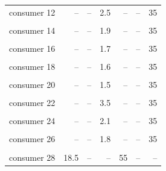 \documentclass[preprint,review,1p,authoryear]{elsarticle} %
\begin{document}
\begin{table}[!h]
{\begin{tabular}[t]{lrrrrrr}
consumer  12 & – & – & 2.5 & – & – & 35\\
\cellcolor{gray!10}{consumer  13} & \cellcolor{gray!10}{–} & \cellcolor{gray!10}{–} & \cellcolor{gray!10}{2.3} & \cellcolor{gray!10}{–} & \cellcolor{gray!10}{–} & \cellcolor{gray!10}{35}\\
consumer  14 & – & – & 1.9 & – & – & 35\\
\cellcolor{gray!10}{consumer  15} & \cellcolor{gray!10}{–} & \cellcolor{gray!10}{–} & \cellcolor{gray!10}{2.7} & \cellcolor{gray!10}{–} & \cellcolor{gray!10}{–} & \cellcolor{gray!10}{35}\\
\addlinespace
consumer  16 & – & – & 1.7 & – & – & 35\\
\cellcolor{gray!10}{consumer  17} & \cellcolor{gray!10}{–} & \cellcolor{gray!10}{–} & \cellcolor{gray!10}{1.9} & \cellcolor{gray!10}{–} & \cellcolor{gray!10}{–} & \cellcolor{gray!10}{35}\\
consumer  18 & – & – & 1.6 & – & – & 35\\
\cellcolor{gray!10}{consumer  19} & \cellcolor{gray!10}{–} & \cellcolor{gray!10}{–} & \cellcolor{gray!10}{1.5} & \cellcolor{gray!10}{–} & \cellcolor{gray!10}{–} & \cellcolor{gray!10}{35}\\
consumer  20 & – & – & 1.5 & – & – & 35\\
\addlinespace
\cellcolor{gray!10}{consumer  21} & \cellcolor{gray!10}{–} & \cellcolor{gray!10}{–} & \cellcolor{gray!10}{1.8} & \cellcolor{gray!10}{–} & \cellcolor{gray!10}{–} & \cellcolor{gray!10}{35}\\
consumer  22 & – & – & 3.5 & – & – & 35\\
\cellcolor{gray!10}{consumer  23} & \cellcolor{gray!10}{–} & \cellcolor{gray!10}{–} & \cellcolor{gray!10}{1.6} & \cellcolor{gray!10}{–} & \cellcolor{gray!10}{–} & \cellcolor{gray!10}{35}\\
consumer  24 & – & – & 2.1 & – & – & 35\\
\cellcolor{gray!10}{consumer  25} & \cellcolor{gray!10}{–} & \cellcolor{gray!10}{–} & \cellcolor{gray!10}{4.5} & \cellcolor{gray!10}{–} & \cellcolor{gray!10}{–} & \cellcolor{gray!10}{35}\\
\addlinespace
consumer  26 & – & – & 1.8 & – & – & 35\\
\cellcolor{gray!10}{consumer  27} & \cellcolor{gray!10}{–} & \cellcolor{gray!10}{–} & \cellcolor{gray!10}{3.2} & \cellcolor{gray!10}{–} & \cellcolor{gray!10}{–} & \cellcolor{gray!10}{35}\\
consumer  28 & 18.5 & – & – & 55 & – & –\\
\bottomrule
\end{tabular}}
\end{table}
\end{document}

